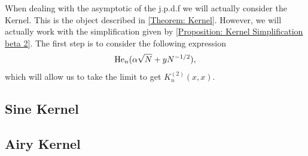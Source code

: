 When dealing with the asymptotic of the j.p.d.f we will actually consider the Kernel. This is the object described in \ref{Theorem: Kernel}. However, we will actually work with the simplification given by \ref{Proposition: Kernel Simplification beta 2}. The first step is to consider the following expression
\begin{equation}
	\mathrm{He}_n(\alpha \sqrt{N} + y N^{-1/2}),
\end{equation}
which will allow us to take the limit to get $K_n^{(2)}(x,x)$.

\subsection{Sine Kernel}



\subsection{Airy Kernel}